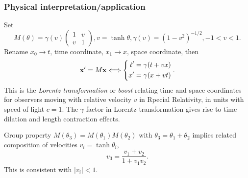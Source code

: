 \documentclass[10pt]{article}
\begin{document}
    \subsubsection*{Physical interpretation/application}
    Set 
    \[
        M(\theta)=\gamma(v)\begin{pmatrix}
            1&v\\
            v&1
        \end{pmatrix}, v=\tanh \theta,\gamma(v)=(1-v^2)^{-1/2}, -1<v<1.
    \]
    Rename $ x_0 \to t $, time coordinate, $ x_1 \to x $, space coordinate, then 
    \[
        {\bf x}'=M{\bf x} \Longleftrightarrow \left\{ \begin{aligned}
             t'=\gamma(t+vx)\\
             x'=\gamma(x+vt)
        \end{aligned} \right. .
    \]
    This is the \textit{Lorentz transformation} or \textit{boost} relating time and space coordinates for observers moving with relative velocity $v$ in Rpecial Relativity, in units with speed of light $c=1$. The $ \gamma $ factor in Lorentz transformation gives rise to time dilation and length contraction effects.

    Group property $ M(\theta_3)=M(\theta_1)M(\theta_2) $ with $ \theta_3=\theta_1+\theta_2 $ implies related composition of velocities $ v_i=\tanh \theta_i $,
    \[
        v_3=\frac{v_1+v_2}{1+v_1v_2}.
    \]
    This is consistent with $|v_i|<1$.
\end{document}
